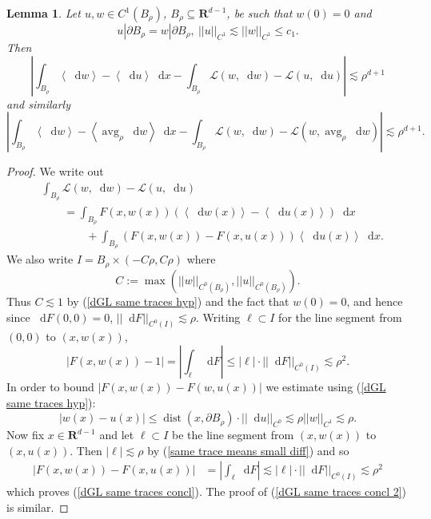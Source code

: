 \documentclass[reqno,10pt]{amsart}
\newcommand{\RR}{\mathbf{R}}
\DeclareMathOperator{\avg}{avg}
\newcommand*\dif{\mathop{}\!\mathrm{d}}
\DeclareMathOperator{\dist}{dist}
\newcommand{\Lagrange}{\mathscr L}
\def\Japan#1{\left \langle #1 \right \rangle}
\newtheorem{lemma}[theorem]{Lemma}
\theoremstyle{definition}
\numberwithin{equation}{section}
\begin{document}
\begin{lemma}\label{dGL same trace}
Let $u, w \in C^1(B_\rho)$, $B_\rho \subseteq \RR^{d - 1}$, be such that $w(0) = 0$ and 
\begin{equation}\label{dGL same traces hyp}
u|\partial B_\rho = w|\partial B_\rho, ~ ||u||_{C^1} \lesssim ||w||_{C^1} \leq c_1.
\end{equation}
Then
\begin{equation}\label{dGL same traces concl}
\left|\int_{B_\rho} \Japan{\dif w} - \Japan{\dif u} \dif x - \int_{B_\rho} \Lagrange(w, \dif w) - \Lagrange(u, \dif u)\right| \lesssim \rho^{d + 1}
\end{equation}
and similarly
\begin{equation}\label{dGL same traces concl 2}
\left|\int_{B_\rho} \Japan{\dif w} - \Japan{\avg_\rho \dif w} \dif x - \int_{B_\rho} \Lagrange(w, \dif w) - \Lagrange(w, \avg_\rho \dif w)\right| \lesssim \rho^{d + 1}.
\end{equation}
\end{lemma}
\begin{proof}
We write out 
\begin{align*}
&\int_{B_\rho} \Lagrange(w, \dif w) - \Lagrange(u, \dif u) \\
&\qquad = \int_{B_\rho} F(x, w(x)) (\Japan{\dif w(x)} - \Japan{\dif u(x)}) \dif x \\
&\qquad \qquad + \int_{B_\rho} (F(x, w(x)) - F(x, u(x))) \Japan{\dif u(x)} \dif x.
\end{align*}
We also write $I = B_\rho \times (-C\rho, C\rho)$ where
$$C := \max(||w||_{C^0(B_\rho)}, ||u||_{C^0(B_\rho)}).$$
Thus $C \lesssim 1$ by (\ref{dGL same traces hyp}) and the fact that $w(0) = 0$, and hence since $\dif F(0, 0) = 0$, $||\dif F||_{C^0(I)} \lesssim \rho$.
Writing $\ell \subset I$ for the line segment from $(0, 0)$ to $(x, w(x))$,
$$|F(x, w(x)) - 1| = \left|\int_\ell \dif F\right| \leq |\ell| \cdot ||\dif F||_{C^0(I)} \lesssim \rho^2.$$
In order to bound $|F(x, w(x)) - F(w, u(x))|$ we estimate using (\ref{dGL same traces hyp}):
\begin{equation}\label{same trace means small diff}
|w(x) - u(x)| \leq \dist(x, \partial B_\rho) \cdot ||\dif u||_{C^0} \lesssim \rho ||w||_{C^1} \lesssim \rho.
\end{equation}
Now fix $x \in \RR^{d - 1}$ and let $\ell \subset I$ be the line segment from $(x, w(x))$ to $(x, u(x))$. Then $|\ell| \lesssim \rho$ by (\ref{same trace means small diff}) and so
\begin{align*}
|F(x, w(x)) - F(x, u(x))| &= \left|\int_\ell \dif F\right| \lesssim |\ell| \cdot ||\dif F||_{C^0(I)} \lesssim \rho^2
\end{align*}
which proves (\ref{dGL same traces concl}). The proof of (\ref{dGL same traces concl 2}) is similar.
\end{proof}
\end{document}
